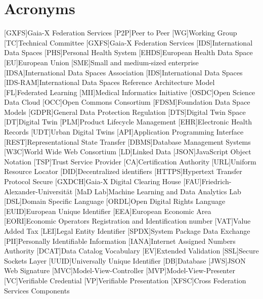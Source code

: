 \chapter{Acronyms}
\begin{acronym}
    [GXFS]{Gaia-X Federation Services}
    [P2P]{Peer to Peer}
    [WG]{Working Group}
    [TC]{Technical Committee}
    [GXFS]{Gaia-X Federation Services}
    [IDS]{International Data Spaces}
    [PHS]{Personal Health System}
    [EHDS]{European Health Data Space}
    [EU]{European Union}
    [SME]{Small and medium-sized enterprise}
    [IDSA]{International Data Spaces Association}
    [IDS]{International Data Spaces}
    [IDS-RAM]{International Data Spaces Reference Architecture Model}
    [FL]{Federated Learning}
    [MII]{Medical Informatics Initiative}
    [OSDC]{Open Science Data Cloud}
    [OCC]{Open Commons Consortium}
    [FDSM]{Foundation Data Space Models}
    [GDPR]{General Data Protection Regulation}
    [DTS]{Digital Twin Space}
    [DT]{Digital Twin}
    [PLM]{Product Lifecycle Management}
    [EHR]{Electronic Health Records}
    [UDT]{Urban Digital Twins}
    [API]{Application Programming Interface}
    [REST]{Representational State Transfer}
    [DBMS]{Database Management Systems}
    [W3C]{World Wide Web Consortium}
    [LD]{Linked Data}
    [JSON]{JavaScript Object Notation}
    [TSP]{Trust Service Provider}
    [CA]{Certification Authority}
    [URL]{Uniform Resource Locator}
    [DID]{Decentralized identifiers}
    [HTTPS]{Hypertext Transfer Protocol Secure}
    [GXDCH]{Gaia-X Digital Clearing House}
    [FAU]{Friedrich-Alexander-Universität}
    [MaD Lab]{Machine Learning and Data Analytics Lab}
    [DSL]{Domain Specific Language}
    [ORDL]{Open Digital Rights Language}
    [EUID]{European Unique Identifier}
    [EEA]{European Economic Area}
    [EORI]{Economic Operators Registration and Identification number}
    [VAT]{Value Added Tax}
    [LEI]{Legal Entity Identifier}
    [SPDX]{System Package Data Exchange}
    [PII]{Personally Identifiable Information}
    [IANA]{Internet Assigned Numbers Authority}
    [DCAT]{Data Catalog Vocabulary}
    [EV]{Extended Validation}
    [SSL]{Secure Sockets Layer}
    [UUID]{Universally Unique Identifier}
    [DB]{Database}
    [JWS]{JSON Web Signature}
    [MVC]{Model-View-Controller}
    [MVP]{Model-View-Presenter}
    [VC]{Verifiable Credential}
    [VP]{Verifiable Presentation}
    [XFSC]{Cross Federation Services Components}
\end{acronym}%
